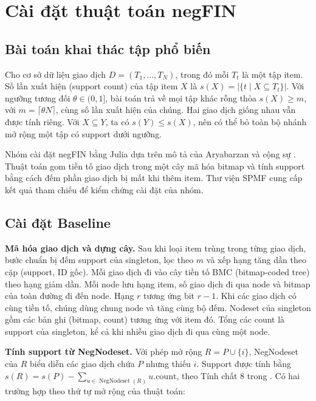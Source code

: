 \section{Cài đặt thuật toán negFIN}\label{sec:ch1}

\subsection{Bài toán khai thác tập phổ biến}

Cho cơ sở dữ liệu giao dịch \(D=(T_1,\ldots,T_N)\), trong đó mỗi \(T_t\) là một tập item. Số lần xuất hiện (support count) của tập item \(X\) là \(s(X)=|\{t\mid X\subseteq T_t\}|\). Với ngưỡng tương đối \(\theta\in(0,1]\), bài toán trả về mọi tập khác rỗng thỏa \(s(X)\ge m\), với \(m=\lceil\theta N\rceil\), cùng số lần xuất hiện của chúng. Hai giao dịch giống nhau vẫn được tính riêng. Với \(X\subseteq Y\), ta có \(s(Y)\le s(X)\), nên có thể bỏ toàn bộ nhánh mở rộng một tập có support dưới ngưỡng.

Nhóm cài đặt negFIN bằng Julia dựa trên mô tả của Aryabarzan và cộng sự \cite{negfin}. Thuật toán gom tiền tố giao dịch trong một cây mã hóa bitmap và tính support bằng cách đếm phần giao dịch bị mất khi thêm item. Thư viện SPMF \cite{spmf} cung cấp kết quả tham chiếu để kiểm chứng cài đặt của nhóm.

\subsection{Cài đặt Baseline}

\textbf{Mã hóa giao dịch và dựng cây.} Sau khi loại item trùng trong từng giao dịch, bước chuẩn bị đếm support của singleton, lọc theo \(m\) và xếp hạng tăng dần theo cặp (support, ID gốc). Mỗi giao dịch đi vào cây tiền tố BMC (bitmap-coded tree) theo hạng giảm dần. Mỗi node lưu hạng item, số giao dịch đi qua node và bitmap của toàn đường đi đến node. Hạng \(r\) tương ứng bit \(r-1\). Khi các giao dịch có cùng tiền tố, chúng dùng chung node và tăng cùng bộ đếm. Nodeset của singleton gồm các bản ghi (bitmap, count) tương ứng với item đó. Tổng các count là support của singleton, kể cả khi nhiều giao dịch đi qua cùng một node.

\textbf{Tính support từ NegNodeset.} Với phép mở rộng \(R=P\cup\{i\}\), NegNodeset của \(R\) biểu diễn các giao dịch chứa \(P\) nhưng thiếu \(i\). Support được tính bằng \(s(R)=s(P)-\sum_{u\in\operatorname{NegNodeset}(R)}u.\mathrm{count}\), theo Tính chất 8 trong \cite{negfin}. Có hai trường hợp theo thứ tự mở rộng của thuật toán:

